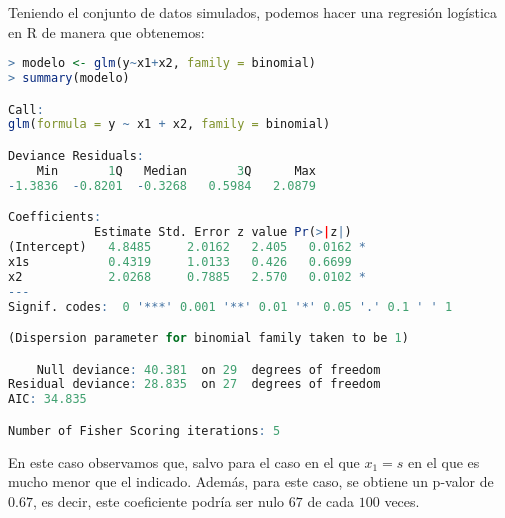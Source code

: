 \documentclass[12pt,a4paper]{article}
\begin{document}
Teniendo el conjunto de datos simulados, podemos hacer una regresión logística en R de manera que obtenemos:
\begin{lstlisting}[language=R, caption = Regresión logística, label =cod:8]
> modelo <- glm(y~x1+x2, family = binomial)
> summary(modelo)

Call:
glm(formula = y ~ x1 + x2, family = binomial)

Deviance Residuals: 
    Min       1Q   Median       3Q      Max  
-1.3836  -0.8201  -0.3268   0.5984   2.0879  

Coefficients:
            Estimate Std. Error z value Pr(>|z|)  
(Intercept)   4.8485     2.0162   2.405   0.0162 *
x1s           0.4319     1.0133   0.426   0.6699  
x2            2.0268     0.7885   2.570   0.0102 *
---
Signif. codes:  0 '***' 0.001 '**' 0.01 '*' 0.05 '.' 0.1 ' ' 1

(Dispersion parameter for binomial family taken to be 1)

    Null deviance: 40.381  on 29  degrees of freedom
Residual deviance: 28.835  on 27  degrees of freedom
AIC: 34.835

Number of Fisher Scoring iterations: 5
\end{lstlisting}
En este caso observamos que, salvo para el caso en el que $x_1 = \textit{s}$ en el que es mucho menor que el indicado. Además, para este caso, se obtiene un p-valor de $0.67$, es decir, este coeficiente podría ser nulo $67$ de cada $100$ veces.
\end{document}
